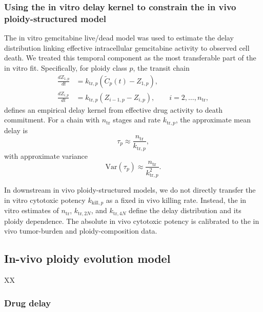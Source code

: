 \documentclass[11pt,notitlepage]{article}
\begin{document}
\color{blue}



\subsubsection*{Using the in vitro delay kernel to constrain the in vivo ploidy-structured model}

The in vitro gemcitabine live/dead model was used to estimate the delay distribution linking effective intracellular gemcitabine activity to observed cell death. We treated this temporal component as the most transferable part of the in vitro fit. Specifically, for ploidy class \(p\), the transit chain
\begin{align}
\frac{dZ_{1,p}}{dt}
&=
k_{\mathrm{tr},p}
\left(
\widetilde C_p(t)-Z_{1,p}
\right),\\
\frac{dZ_{i,p}}{dt}
&=
k_{\mathrm{tr},p}
\left(
Z_{i-1,p}-Z_{i,p}
\right),
\qquad i=2,\ldots,n_{\mathrm{tr}},
\end{align}
defines an empirical delay kernel from effective drug activity to death commitment. For a chain with \(n_{\mathrm{tr}}\) stages and rate \(k_{\mathrm{tr},p}\), the approximate mean delay is
\begin{equation}
\tau_p \approx \frac{n_{\mathrm{tr}}}{k_{\mathrm{tr},p}},
\end{equation}
with approximate variance
\begin{equation}
\mathrm{Var}(\tau_p) \approx \frac{n_{\mathrm{tr}}}{k_{\mathrm{tr},p}^2}.
\end{equation}

In downstream in vivo ploidy-structured models, we do not directly transfer the in vitro cytotoxic potency \(k_{\mathrm{kill},p}\) as a fixed in vivo killing rate. Instead, the in vitro estimates of \(n_{\mathrm{tr}}\), \(k_{\mathrm{tr},2N}\), and \(k_{\mathrm{tr},4N}\) define the delay distribution and its ploidy dependence. The absolute in vivo cytotoxic potency is calibrated to the in vivo tumor-burden and ploidy-composition data.



\subsection*{In-vivo ploidy evolution model}

XX

\subsubsection*{Drug delay}
\end{document}
